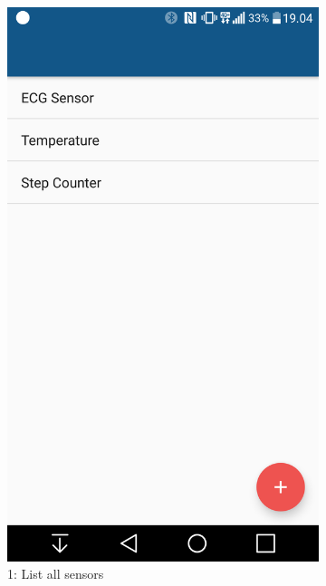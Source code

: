 \begin{figure}[H]
\centering
    \begin{subfigure}[b]{0.45\textwidth}
        \includegraphics[width=\textwidth]{img/gw1.png}
        \caption*{1: List all sensors}
        \label{fig:01login}
    \end{subfigure}
    \begin{subfigure}[b]{0.45\textwidth}

\end{subfigure}
\end{figure}
